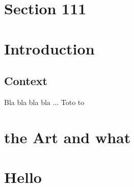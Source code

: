 \documentclass{paper}
\begin{document}
\section{Section 111}
\section{Introduction}
\subsection{Context}
Bla bla bla bla ...
Toto to
\section{the Art and what}
\section{Hello}
\end{document}
